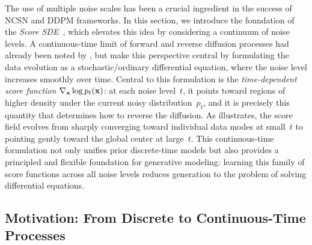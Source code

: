The use of multiple noise scales has been a crucial ingredient in the success of NCSN and DDPM frameworks. In this section, we introduce the foundation of the \emph{Score SDE}~\citep{song2020score}, which elevates this idea by considering a continuum of noise levels. A continuous-time limit of forward and reverse diffusion processes had already been noted by \citet{sohl2015deep}, but \citet{song2020score} make this perspective central by formulating the data evolution as a stochastic/ordinary differential equation, where the noise level increases smoothly over time. Central to this formulation is the \emph{time-dependent score function} $\nabla_{{\mathbf{x}}}\log p_t({\mathbf{x}})$: at each noise level~$t$, it points toward regions of higher density under the current noisy distribution~$p_t$, and it is precisely this quantity that determines how to reverse the diffusion. As  illustrates, the score field evolves from sharply converging toward individual data modes at small~$t$ to pointing gently toward the global center at large~$t$. This continuous-time formulation not only unifies prior discrete-time models but also provides a principled and flexible foundation for generative modeling: learning this family of score functions across all noise levels reduces generation to the problem of solving differential equations.






\subsection{Motivation: From Discrete to Continuous-Time Processes}\label{subsec:scoresde-motivation}

